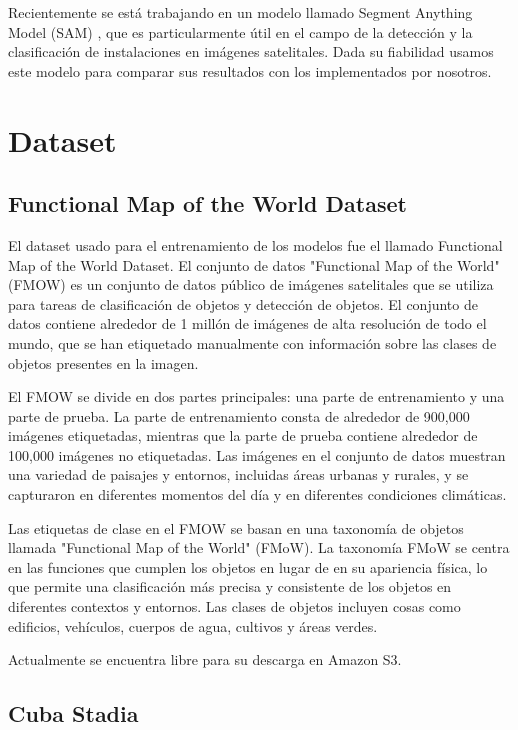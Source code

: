 \documentclass[article]{llncs}
\begin{document}
Recientemente se está trabajando en un modelo llamado Segment Anything Model (SAM) \cite{SAM}, que es particularmente útil 
en el campo de la detección y la clasificación de instalaciones en imágenes satelitales. Dada su fiabilidad usamos 
este modelo para comparar sus resultados con los implementados por nosotros.




\section{Dataset}

\subsection{Functional Map of the World Dataset}

El dataset usado para el entrenamiento de los modelos fue el llamado Functional Map of the World Dataset. 
El conjunto de datos "Functional Map of the World" (FMOW) es un conjunto de datos público de imágenes satelitales 
que se utiliza para tareas de clasificación de objetos y detección de objetos. El conjunto de datos contiene alrededor 
de 1 millón de imágenes de alta resolución de todo el mundo, que se han etiquetado manualmente con información sobre 
las clases de objetos presentes en la imagen.

El FMOW se divide en dos partes principales: una parte de entrenamiento y una parte de prueba. La parte de entrenamiento 
consta de alrededor de 900,000 imágenes etiquetadas, mientras que la parte de prueba contiene alrededor de 100,000 
imágenes no etiquetadas. Las imágenes en el conjunto de datos muestran una variedad de paisajes y entornos, incluidas 
áreas urbanas y rurales, y se capturaron en diferentes momentos del día y en diferentes condiciones climáticas.

Las etiquetas de clase en el FMOW se basan en una taxonomía de objetos llamada "Functional Map of the World" (FMoW). La 
taxonomía FMoW se centra en las funciones que cumplen los objetos en lugar de en su apariencia física, lo que permite 
una clasificación más precisa y consistente de los objetos en diferentes contextos y entornos. Las clases de objetos 
incluyen cosas como edificios, vehículos, cuerpos de agua, cultivos y áreas verdes.

Actualmente se encuentra libre para su descarga en Amazon S3.

\subsection{Cuba Stadia}
\end{document}
